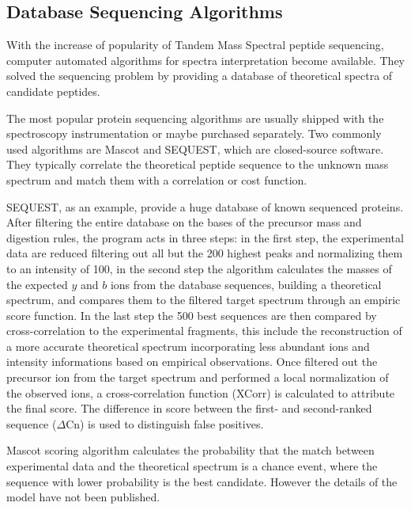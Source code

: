 \subsection{Database Sequencing Algorithms}

With the increase of popularity of Tandem Mass Spectral peptide sequencing,
computer automated algorithms for spectra interpretation become available. They
solved the sequencing problem by providing a database of theoretical spectra of
candidate peptides. 

The most popular protein sequencing algorithms are usually shipped with the
spectroscopy instrumentation or maybe purchased separately.
Two commonly used algorithms are Mascot\cite{eng1994} and
SEQUEST\cite{Perkins1999}, which are closed-source software.
They typically correlate the theoretical peptide sequence to the unknown mass
spectrum and match them with a correlation or cost function.

SEQUEST, as an example, provide a huge database of known sequenced proteins.
After filtering the entire database on the bases of the precursor mass and
digestion rules, the
program acts in three steps: in the first step, the experimental data are
reduced filtering out all but the 200 highest peaks and normalizing them to an
intensity of 100, in the second step the algorithm 
calculates the masses of the expected $y$ and $b$ ions from the database sequences, building a theoretical
spectrum, and compares them to the filtered target spectrum through an empiric
score function. 
In the last step the 500 best sequences are then compared by cross-correlation to the
experimental fragments, this include the reconstruction of a more accurate theoretical
spectrum incorporating less abundant ions and intensity informations based on
empirical observations. Once filtered out the precursor ion from the target
spectrum and performed a local normalization of the observed ions, a
cross-correlation function (XCorr) is calculated to attribute the final score.
The difference in score between the first- and second-ranked sequence
($\Delta$Cn) is used to distinguish false positives. 

Mascot scoring algorithm calculates the probability that the match between
experimental data and the theoretical spectrum is a chance event, where the sequence
with lower probability is the best candidate. However the details of the model
have not been published.


